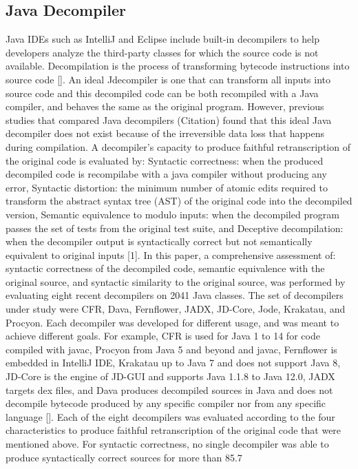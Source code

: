 \documentclass{article}
\begin{document}
\subsection{Java Decompiler}
Java IDEs such as IntelliJ and Eclipse include built-in decompilers to help developers analyze the third-party classes for which the source code is not available. Decompilation is the process of transforming bytecode instructions into source code []. An ideal Jdecompiler is one that can transform all inputs into source code and this decompiled code can be both recompiled with a Java compiler, and behaves the same as the original program. However, previous studies that compared Java decompilers (Citation) found that this ideal Java decompiler does not exist because of the irreversible data loss that happens during compilation.
A decompiler’s capacity to produce faithful retranscription of the original code is evaluated by: Syntactic correctness: when the produced decompiled code is recompilabe with a java compiler without producing any error, Syntactic distortion: the minimum number of atomic edits required to transform the abstract syntax tree (AST) of the original code into the decompiled version, Semantic equivalence to modulo inputs: when the decompiled program passes the set of tests from the original test suite, and Deceptive decompilation: when the decompiler output is syntactically correct but not semantically equivalent to original inputs [1].
In this paper, a comprehensive assessment of: syntactic correctness of the decompiled code, semantic equivalence with the original source, and syntactic similarity to the original source, was performed by evaluating eight recent decompilers on 2041 Java classes. The set of decompilers under study were CFR, Dava, Fernflower, JADX, JD-Core, Jode, Krakatau, and Procyon. Each decompiler was developed for different usage, and was meant to achieve different goals. For example, CFR is used for Java 1 to 14 for code compiled with javac, Procyon from Java 5 and beyond and javac, Fernflower is embedded in IntelliJ IDE, Krakatau up to Java 7 and does not support Java 8, JD-Core is the engine of JD-GUI and supports Java 1.1.8 to Java 12.0, JADX targets dex files, and Dava produces decompiled sources in Java and does not decompile bytecode produced by any specific compiler nor from any specific language [].
Each of the eight decompilers was evaluated according to the four characteristics to produce faithful retranscription of the original code that were mentioned above. For syntactic correctness, no single decompiler was able to produce syntactically correct sources for more than 85.7%
\end{document}
